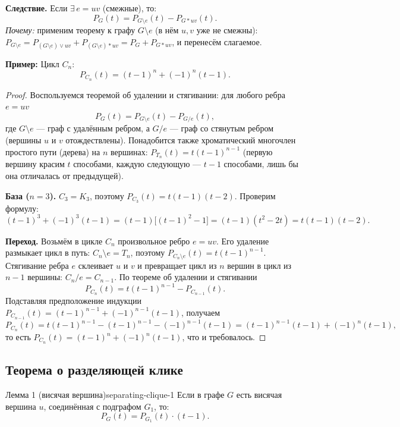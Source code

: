 \medskip
\textbf{Следствие.} Если $\exists\, e = uv$ (смежные), то:
\[
  P_G(t) = P_{G \setminus e}(t) - P_{G * uv}(t).
\]
\textit{Почему:} применим теорему к графу $G \setminus e$ (в нём $u, v$
уже не смежны): $P_{G \setminus e} = P_{(G\setminus e) \vee uv} +
P_{(G \setminus e) * uv} = P_G + P_{G * uv}$, и перенесём слагаемое.

\medskip
\textbf{Пример:} Цикл $C_n$:
\[
  P_{C_n}(t) = (t-1)^n + (-1)^n (t-1).
\]

\begin{proof}
Воспользуемся теоремой об удалении и стягивании: для любого ребра $e=uv$
\[
  P_G(t) = P_{G\setminus e}(t) - P_{G/e}(t),
\]
где $G\setminus e$ --- граф с удалённым ребром, а $G/e$ --- граф со
стянутым ребром (вершины $u$ и $v$ отождествлены). Понадобится также
хроматический многочлен простого пути (дерева) на $n$ вершинах:
$P_{T_n}(t)=t(t-1)^{n-1}$ (первую вершину красим $t$ способами, каждую
следующую --- $t-1$ способами, лишь бы она отличалась от предыдущей).

\textbf{База ($n=3$).} $C_3=K_3$, поэтому $P_{C_3}(t)=t(t-1)(t-2)$.
Проверим формулу:
\[
  (t-1)^3+(-1)^3(t-1)=(t-1)\bigl[(t-1)^2-1\bigr]=(t-1)(t^2-2t)=t(t-1)(t-2).
\]

\textbf{Переход.} Возьмём в цикле $C_n$ произвольное ребро $e=uv$. Его удаление
размыкает цикл в путь: $C_n\setminus e=T_n$, поэтому
$P_{C_n\setminus e}(t)=t(t-1)^{n-1}$. Стягивание ребра $e$ склеивает $u$ и $v$
и превращает цикл из $n$ вершин в цикл из $n-1$ вершины: $C_n/e=C_{n-1}$.
По теореме об удалении и стягивании
\[
  P_{C_n}(t)=t(t-1)^{n-1}-P_{C_{n-1}}(t).
\]
Подставляя предположение индукции
$P_{C_{n-1}}(t)=(t-1)^{n-1}+(-1)^{n-1}(t-1)$, получаем
\[
  P_{C_n}(t)=t(t-1)^{n-1}-(t-1)^{n-1}-(-1)^{n-1}(t-1)
           =(t-1)^{n-1}(t-1)+(-1)^{n}(t-1),
\]
то есть $P_{C_n}(t)=(t-1)^n+(-1)^n(t-1)$, что и требовалось.
\end{proof}

\subsection*{Теорема о разделяющей клике}

\begin{lemma}{Лемма 1 (висячая вершина)}{separating-clique-1}
Если в графе $G$ есть висячая вершина $u$, соединённая с подграфом $G_1$, то:
\[
  P_G(t) = P_{G_1}(t) \cdot (t-1).
\]
\end{lemma}

